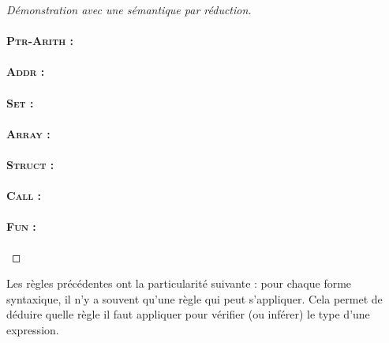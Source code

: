 \begin{proof}[Démonstration avec une sémantique par réduction]
\paragraph{\textsc{Ptr-Arith} :} %
\paragraph{\textsc{Addr} :} %
\paragraph{\textsc{Set} :} %
\paragraph{\textsc{Array} :} %
\paragraph{\textsc{Struct} :} %
\paragraph{\textsc{Call} :} %
\paragraph{\textsc{Fun} :} %

\end{proof}

Les règles précédentes ont la particularité suivante : pour chaque forme
syntaxique, il n'y a souvent qu'une règle qui peut s'appliquer. Cela permet de
déduire quelle règle il faut appliquer pour vérifier (ou inférer) le type d'une
expression.

